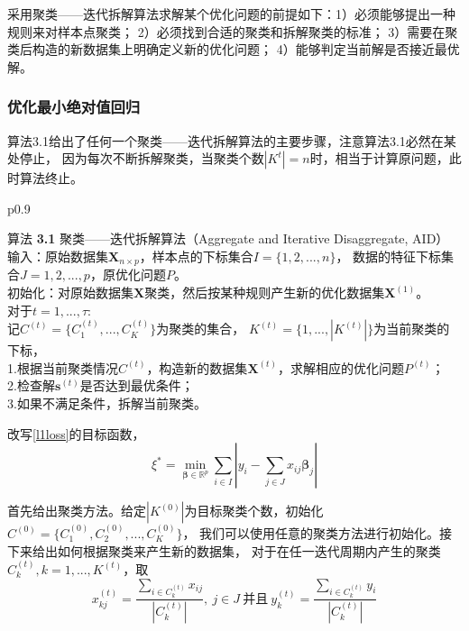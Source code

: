 采用聚类——迭代拆解算法求解某个优化问题的前提如下：1）必须能够提出一种规则来对样本点聚类；
2）必须找到合适的聚类和拆解聚类的标准；
3）需要在聚类后构造的新数据集上明确定义新的优化问题；
4）能够判定当前解是否接近最优解。

\subsubsection{优化最小绝对值回归}
算法3.1给出了任何一个聚类——迭代拆解算法的主要步骤，注意算法3.1必然在某处停止，
因为每次不断拆解聚类，当聚类个数$|K^{t}|= n$时，相当于计算原问题，此时算法终止。
\begin{table}[H]%
    \centering%
    \begin{tabular}{{p{0.9\columnwidth}}}%
    
    \toprule%
    {\heiti 算法} {\bf3.1} 聚类——迭代拆解算法（Aggregate and Iterative Disaggregate, AID） \\
    \midrule%
    输入：原始数据集$\bm{X}_{n\times p}$，样本点的下标集合${I} = \{1, 2, ..., n\}$，
    数据的特征下标集合${J} = {1, 2, ..., p}$，原优化问题$P$。\\
    初始化：对原始数据集$\bm{X}$聚类，然后按某种规则产生新的优化数据集$\bm{X}^{(1)}$。 \\
    对于$t = 1, ..., \tau$:\\
        记${C}^{(t)} = \{{C}_1^{(t)}, ..., C_K^{(t)}\}$为聚类的集合， $K^{(t)} = \{1, ..., |K^{(t)}|\}$为当前聚类的下标，
        \\
        1.根据当前聚类情况${C}^{(t)}$，构造新的数据集$\bm{X}^{(t)}$，求解相应的优化问题${P}^{(t)}$； \\
        2.检查解$\bm{s}^{(t)}$是否达到最优条件；\\
        3.如果不满足条件，拆解当前聚类。
        \\
    \bottomrule%
    \end{tabular}
\end{table}%

改写\eqref{l1loss}的目标函数，
\begin{equation}\label{l1loss2}
\xi^* = \underset{\bm{\beta} \in \mathbb{R}^{p}}{\operatorname{min}} 
\sum_{i \in I}|y_i - \sum_{j \in J}x_{ij}\bm{\beta}_j|
\end{equation}

首先给出聚类方法。给定$|K^{(0)}|$为目标聚类个数，初始化$C^{(0)} = \{C_1^{(0)}, C_2^{(0)}, ..., C_K^{(0)}\}$，
我们可以使用任意的聚类方法进行初始化。接下来给出如何根据聚类来产生新的数据集，
对于在任一迭代周期内产生的聚类$C^{(t)}_k, k = 1, ..., K^{(t)}$，取
\begin{equation*}
    x_{kj}^{(t)} = \frac{\sum_{i \in C_k^{(t)}}x_{ij}}{|C_k^{(t)}|},\ j \in J \  
    \text{并且} \
    y_{k}^{(t)} = \frac{\sum_{i \in C_k^{(t)}}y_i}{|C_k^{(t)}|}
\end{equation*}

